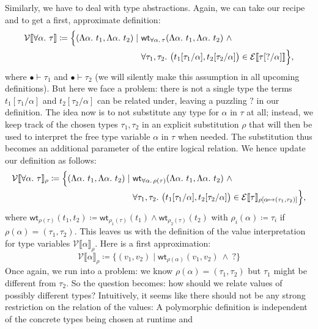\documentclass[12pt]{article}
\theoremstyle{plain}
\theoremstyle{definition}
\newcommand{\denot}[1]{\llbracket#1\rrbracket}
\newcommand{\vint}[1]{\mathcal{V}\denot{#1}}
\newcommand{\tint}[1]{\mathcal{E}\denot{#1}}
\newcommand{\wt}[1]{\mathsf{wt}_{#1}}
\begin{document}
Similarly, we have to deal with type abstractions.
Again, we can take our recipe and to get a first, approximate definition:
\begin{align*}
  \vint{\forall \alpha.\ \tau}\coloneqq
  \Bigl\{(\Lambda \alpha.\ t_1, \Lambda \alpha.\ t_2) \mid\
  &\wt{\forall \alpha.\, \tau}(\Lambda \alpha.\ t_1, \Lambda \alpha.\ t_2)\ \land\\
  &\forall \tau_1,\tau_2.\ \bigl(t_1[\tau_1/\alpha],t_2[\tau_2/\alpha]\bigr)\in\tint{\tau[?/\alpha]} \Bigr\},
\end{align*}
where $\bullet\vdash\tau_1$ and $\bullet\vdash\tau_2$ (we will silently make this assumption in all upcoming definitions).
But here we face a problem: there is not a single type the terms $t_1[\tau_1/\alpha]$ and $t_2[\tau_2/\alpha]$ can be related under, leaving a puzzling $?$ in our definition.
The idea now is to not substitute any type for $\alpha$ in $\tau$ at all;
instead, we keep track of the chosen types $\tau_1,\tau_2$ in an explicit
substitution $\rho$ that will then be used to interpret the free type variable $\alpha$ in $\tau$ when needed.
The substitution thus becomes an additional parameter of the entire logical relation.
We hence update our definition as follows:
\begin{align*}
  \vint{\forall \alpha.\ \tau}_\rho\coloneqq
  \Bigl\{(\Lambda \alpha.\ t_1, \Lambda \alpha.\ t_2) \mid\
  &\wt{\forall \alpha.\, \rho(\tau)}(\Lambda \alpha.\ t_1, \Lambda \alpha.\ t_2)\ \land\\
  &\forall \tau_1,\tau_2.\ \bigl(t_1[\tau_1/\alpha],t_2[\tau_2/\alpha]\bigr)\in\tint{\tau}_{\rho[\alpha\mapsto(\tau_1,\tau_2)]} \Bigr\},
\end{align*}
where $\wt{\rho(\tau)}(t_1,t_2)\coloneqq \wt{\rho_1(\tau)}(t_1)\land\wt{\rho_2(\tau)}(t_2)$
with $\rho_i(\alpha)\coloneqq \tau_i$ if $\rho(\alpha)=(\tau_1,\tau_2)$.
This leaves us with the definition of the value interpretation for type variables $\vint{\alpha}_\rho$.
Here is a first approximation:
\begin{equation*}
\vint{\alpha}_\rho\coloneqq
  \bigl\{(v_1,v_2) \mid
  \wt{\rho(\alpha)}(v_1,v_2)\ \land\ ? \bigr\}
\end{equation*}
Once again, we run into a problem: we know $\rho(\alpha)=(\tau_1,\tau_2)$ but $\tau_1$ might be different from $\tau_2$.
So the question becomes: how should we relate values of possibly different types?
Intuitively, it seems like there should not be any strong restriction on the relation of the values:
A polymorphic definition is independent of the concrete types being chosen at runtime and
\end{document}

